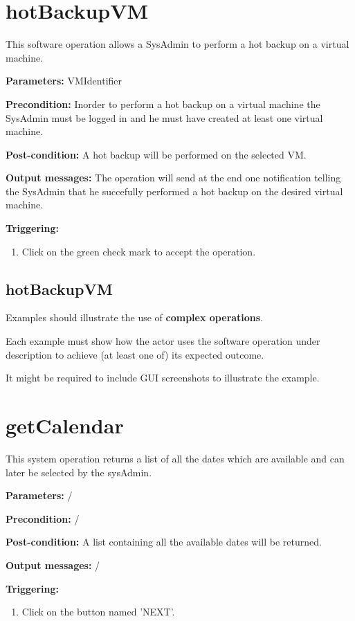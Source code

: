 \section{hotBackupVM}
\label{operation:hotBackupVM}
This software operation allows a SysAdmin to perform a hot backup on a virtual
machine.
\begin{description}

\item \textbf{Parameters:} VMIdentifier
\item \textbf{Precondition:} Inorder to perform a hot backup on a virtual
machine the SysAdmin must be logged in and he must have created at least one
virtual machine.
\item \textbf{Post-condition:} A hot backup will be performed on the selected
VM.
\item \textbf{Output messages:} The operation will send at the end one
notification telling the SysAdmin that he succefully performed a hot backup on
the desired virtual machine.

\item \textbf{Triggering:}
\begin{enumerate}
\item Click on the green check mark to accept the operation.
\end{enumerate}

 
\end{description}

 
\subsection{hotBackupVM}
Examples should illustrate the use of \textbf{complex operations}.

Each example must show how the actor uses the software operation under
description to achieve (at least one of) its expected outcome.

It might be required to include GUI screenshots to illustrate the example.





\section{getCalendar}
\label{operation:getCalendar}
This system operation returns a list of all the dates which are available and
can later be selected by the sysAdmin.
\begin{description}

\item \textbf{Parameters:} /
\item \textbf{Precondition:} /
\item \textbf{Post-condition:} A list containing all the available dates will be
returned.
\item \textbf{Output messages:} /

\item \textbf{Triggering:}
\begin{enumerate}
\item Click on the button named 'NEXT'.
\end{enumerate}

 
\end{description}


